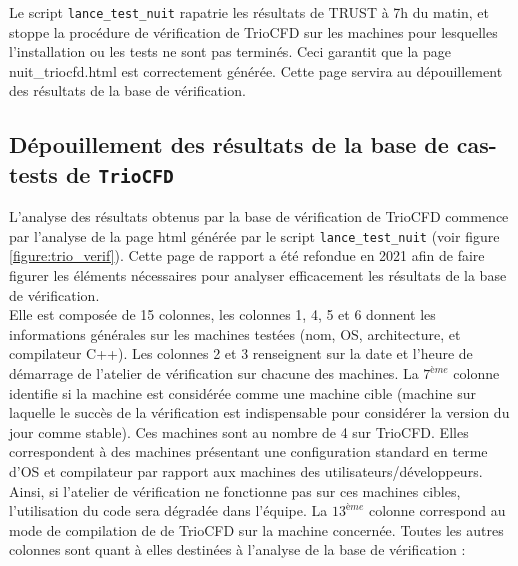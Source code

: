 Le script \texttt{lance\_test\_nuit} rapatrie les résultats de TRUST à 7h du matin, et stoppe la procédure de vérification de TrioCFD sur les machines pour lesquelles l'installation ou les tests ne sont pas terminés. Ceci garantit que la page nuit\_triocfd.html est correctement générée. Cette page servira au dépouillement des résultats de la base de vérification.


\subsection{Dépouillement des résultats de la base de cas-tests de \texttt{TrioCFD}}

L'analyse des résultats obtenus par la base de vérification de TrioCFD commence par l'analyse de la page html générée par le script \texttt{lance\_test\_nuit} (voir figure \ref{figure:trio_verif}). Cette page de rapport a été refondue en 2021 afin de faire figurer les éléments nécessaires pour analyser efficacement les résultats de la base de vérification.\smallskip\\
 Elle est composée de 15 colonnes, les colonnes 1, 4, 5 et 6 donnent les informations générales sur les machines testées (nom, OS, architecture, et compilateur C++). Les colonnes 2 et 3 renseignent sur la date et l'heure de démarrage de l'atelier de vérification sur chacune des machines. La $7^{ème}$ colonne identifie si la machine est considérée comme une machine cible (machine sur laquelle le succès de la vérification est indispensable pour considérer la version du jour comme stable). Ces machines sont au nombre de 4 sur TrioCFD. Elles correspondent à des machines présentant une configuration standard en terme d'OS et compilateur par rapport aux machines des utilisateurs/développeurs. Ainsi, si l'atelier de vérification ne fonctionne pas sur ces machines cibles, l'utilisation du code sera dégradée dans l'équipe. La $13^{ème}$ colonne correspond au mode de compilation de de TrioCFD sur la machine concernée. Toutes les autres colonnes sont quant à elles destinées à l'analyse de la base de vérification :\\
